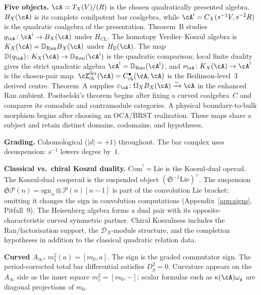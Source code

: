 \smallskip\noindent\textbf{Five objects.}
$\cA=T_X(V)/(R)$ is the chosen quadratically presented algebra.
$B_X(\cA)$ is its complete conilpotent bar coalgebra, while
$\cA^{\mathrm i}=C_X(s^{-1}V,s^{-2}R)$ is the quadratic coalgebra of the
presentation. Theorem~B studies
$q_\cA\colon\cA^{\mathrm i}\to B_X(\cA)$ under $H_{\mathrm{CL}}$.
The homotopy Verdier--Koszul algebra is
$K_X(\cA)=\mathbb D_{\operatorname{Ran}}B_X(\cA)$ under
$H_{\mathbb D}(\cA)$.  The map
$\mathbb D(q_\cA)\colon K_X(\cA)\to
\mathbb D_{\operatorname{Ran}}(\cA^{\mathrm i})$ is the quadratic
comparison; local finite duality gives the strict quadratic algebra
$\cA^!=\mathbb D_{\operatorname{Ran}}(\cA^{\mathrm i})$, and
$\nu_\cA\colon K_X(\cA)\to\cA^!$ is the chosen-pair map.
$\cZ^{\mathrm{der}}_{\mathrm{ch}}(\cA) =
C^\bullet_{\mathrm{ch}}(\cA,\cA)$ is the Beilinson-level~3 derived
centre. Theorem~A supplies
$\varepsilon_\cA\colon\Omega_XB_X(\cA)\xrightarrow{\sim}\cA$ in the
enhanced Ran ambient. Positselski's theorem begins after fixing a
curved coalgebra~$C$ and compares its comodule and contramodule
categories. A physical boundary-to-bulk morphism begins after choosing
an OCA/BRST realization. These maps share a subject and retain distinct
domains, codomains, and hypotheses.

\smallskip\noindent\textbf{Grading.}
Cohomological ($|d| = +1$) throughout. The bar complex uses desuspension: $s^{-1}$ lowers degree by~$1$.

\smallskip\noindent\textbf{Classical vs.\ chiral Koszul duality.}
$\mathrm{Com}^! = \mathrm{Lie}$ is the Koszul-dual operad.
The Koszul-dual cooperad is the suspended object
$(\mathfrak S^{-1}\mathrm{Lie})^\vee$. The suspension
$\mathfrak{S}\mathcal{P}(n)
= \mathrm{sgn}_n \otimes \mathcal{P}(n)[n{-}1]$
is part of the convolution Lie bracket; omitting it changes the
sign in convolution computations
(Appendix~\ref{app:signs}, Pitfall~9).
The Heisenberg algebra forms a dual pair with its opposite-characteristic
curved symmetric partner.
Chiral Koszulness includes the Ran/factorisation support, the
$\mathcal D_X$-module structure, and the completion hypotheses in
addition to the classical quadratic relation data.

\smallskip\noindent\textbf{Curved $A_\infty$.}
$m_1^2(a) = [m_0, a]$. The sign is the graded commutator sign.
The period-corrected total bar differential satisfies $D_g^2=0$.
Curvature appears on the $A_\infty$ side as the inner square
$m_1^2=[m_0,-]$; scalar formulas such as
$\kappa(\cA)\omega_g$ are diagonal projections of $m_0$.

